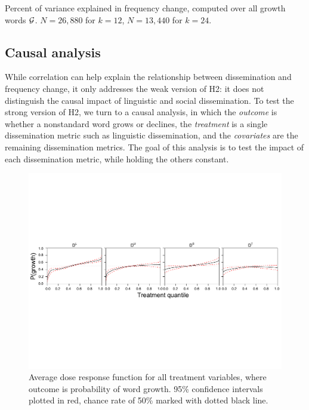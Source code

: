 \begin{table}[t!]
\small
\centering

\caption{Percent of variance explained in frequency change, computed over all growth words $\mathcal{G}$.
$N=26,880$ for $k=12$, $N=13,440$ for $k=24$.} 
\label{tab:relative-importance-test}
\end{table}

\subsection{Causal analysis}
\label{sec:results-causal}
While correlation can help explain the relationship between dissemination and frequency change, it only addresses the weak version of H2: it does not distinguish the causal impact of linguistic and social dissemination. 
To test the strong version of H2, we turn to a causal analysis, in which the \emph{outcome} is whether a nonstandard word grows or declines, the \emph{treatment} is a single dissemination metric such as linguistic dissemination, and the \emph{covariates} are the remaining dissemination metrics. 
The goal of this analysis is to test the impact of each dissemination metric, while holding the others constant. 

\begin{figure}
\includegraphics[width=\textwidth]{figures/ADRF_curves_1_12_100_DL,DU,DS,DT.pdf}
\caption{Average dose response function for all treatment variables, where outcome is probability of word growth. 95\% confidence intervals plotted in red, chance rate of 50\% marked with dotted black line.}
\label{fig:ADRF_curves}
\end{figure}

